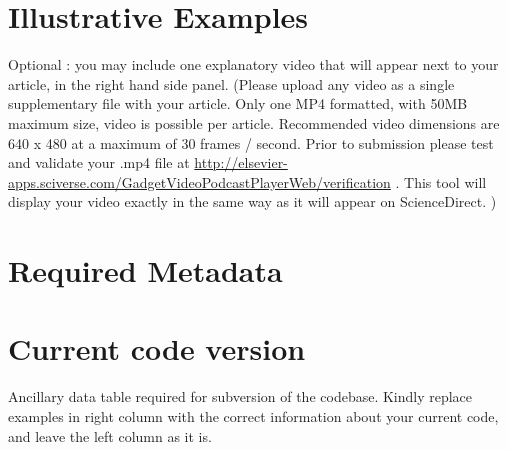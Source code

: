 \documentclass[preprint,12pt,letterpaper]{elsarticle}
\begin{document}
%
%
%

\section*{Illustrative Examples}
Optional : you may include one explanatory  video that will appear next to your article, in the right hand side panel. (Please upload any video as a single supplementary file with your article. Only one MP4 formatted, with 50MB maximum size, video is possible per article. Recommended video dimensions are 640 x 480 at a maximum of 30 frames / second. Prior to submission please test and validate your .mp4 file at  \url{http://elsevier-apps.sciverse.com/GadgetVideoPodcastPlayerWeb/verification} . This tool will display your video exactly in the same way as it will appear on ScienceDirect. )


\section*{Required Metadata}

\section*{Current code version}

Ancillary data table required for subversion of the codebase. Kindly replace examples in right column with the correct information about your current code, and leave the left column as it is.
\end{document}
